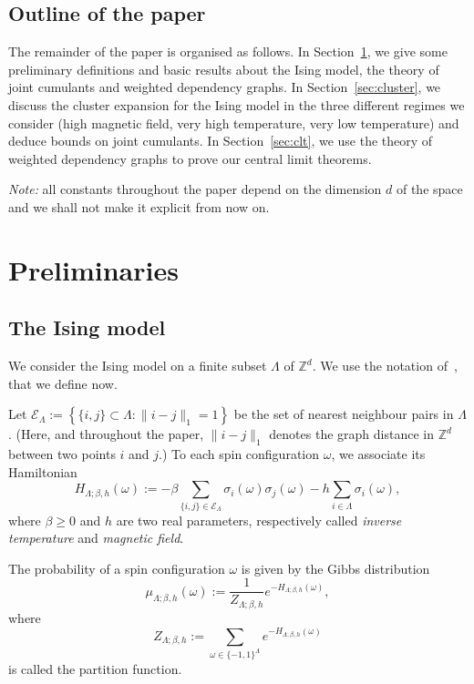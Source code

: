 \documentclass{amsart}
\newcommand{\field}[1]{\mathbb{#1}}
\newcommand{\Z}{\field{Z}}
\newcommand{\dist}[2]{\|#1 - #2\|_1}
\def\EEE{\mathcal{E}}
\numberwithin{equation}{section}
\theoremstyle{remark}
\begin{document}
\subsection{Outline of the paper}
The remainder of the paper is organised as follows. In Section~\ref{sec:prelim}, we give some preliminary definitions and basic results about the Ising model, the theory of joint cumulants and weighted dependency graphs. In Section~\ref{sec:cluster}, we discuss the cluster expansion for the Ising model in the three different regimes we consider (high magnetic field, very high temperature, very low temperature) and deduce bounds on joint cumulants. In Section~\ref{sec:clt}, we use the theory of weighted dependency graphs to prove our central limit theorems.
\medskip

{\em Note:}
all constants throughout the paper depend on the dimension $d$ of the space and we shall not make it explicit from now on.

\section{Preliminaries}
\label{sec:prelim}
\subsection{The Ising model}
\label{sec:prelimIsing}
We consider the Ising model on a finite subset $\Lambda$ of $\Z^d.$ We use the notation of~\cite{Velenik}, that we define now. 


Let $\EEE_{\Lambda} := \left\lbrace \{i,j\} \subset \Lambda : \dist{i}{j}=1 \right\rbrace$ be the set of nearest neighbour pairs in $\Lambda$.
(Here, and throughout the paper, $\dist{i}{j}$ denotes the graph distance in $\Z^d$ between two points $i$ and $j$.)
 To each spin configuration $\omega$, we associate its Hamiltonian
$$H_{\Lambda;\beta, h} (\omega):= -\beta \sum_{\{i,j\} \in \EEE_{\Lambda} } \sigma_i(\omega) \sigma_j(\omega) - h \sum_{i \in \Lambda} \sigma_i(\omega),$$
where $\beta \geq 0$ and $h$ are two real parameters,
respectively called {\em inverse temperature} and {\em magnetic field}.

The probability of a spin configuration $\omega$ is given by the Gibbs distribution
$$\mu_{\Lambda;\beta, h} (\omega):= \frac{1}{Z_{\Lambda;\beta, h}} e^{-H_{\Lambda;\beta, h} (\omega)},$$
where
$$Z_{\Lambda;\beta, h}:= \sum_{\omega \in \{-1,1\}^{\Lambda}} e^{-H_{\Lambda;\beta, h} (\omega)}$$
is called the partition function.
\end{document}
